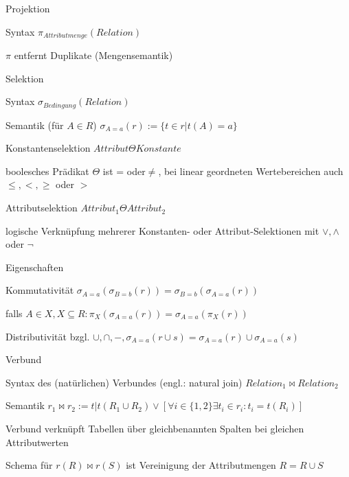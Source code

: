 \documentclass[a4paper]{article}
\begin{document}
\begin{multicols}{3}
    Projektion
    \begin{itemize*}
        \item Syntax $\pi_{Attributmenge}(Relation)$
        \item $\pi$ entfernt Duplikate (Mengensemantik)
    \end{itemize*}

    Selektion
    \begin{itemize*}
        \item Syntax $\sigma_{Bedingung} (Relation)$
        \item Semantik (für $A\in R$) $\sigma_{A=a}(r) := \{t \in r | t(A) = a\}$
        \item Konstantenselektion $Attribut \Theta Konstante$
        \begin{itemize*}
            \item boolesches Prädikat $\Theta$ ist = oder$\not=$, bei linear geordneten Wertebereichen auch $\leq, <, \geq$ oder $>$
        \end{itemize*}
        \item Attributselektion $Attribut_1 \Theta Attribut_2$
        \item logische Verknüpfung mehrerer Konstanten- oder Attribut-Selektionen mit $\vee, \wedge$ oder $\neg$
        \item Eigenschaften
        \begin{itemize*}
            \item Kommutativität $\sigma_{A=a}(\sigma_{B=b} (r)) = \sigma_{B=b} (\sigma_{A=a} (r))$
            \item falls $A\in X, X \subseteq R: \pi_X(\sigma_{A=a} (r)) = \sigma_{A=a} (\pi_{X} (r))$
            \item Distributivität bzgl. $\cup, \cap, - , \sigma_{A=a} (r \cup s) = \sigma_{A=a} (r) \cup \sigma_{A=a} (s)$
        \end{itemize*}
        \item Verbund
        \begin{itemize*}
            \item Syntax des (natürlichen) Verbundes (engl.: natural join) $Relation_1 \bowtie Relation_2$
            \item Semantik $r_1 \bowtie r_2 := {t | t(R_1\cup  R_2 ) \vee [\forall i \in \{1, 2\}\exists t_i \in r_i : t_i = t(R_i )]}$
            \item Verbund verknüpft Tabellen über gleichbenannten Spalten bei gleichen Attributwerten
            \item Schema für $r(R) \bowtie r(S)$ ist Vereinigung der Attributmengen $R = R \cup S$

\end{itemize*}
\end{itemize*}
\end{multicols}
\end{document}
